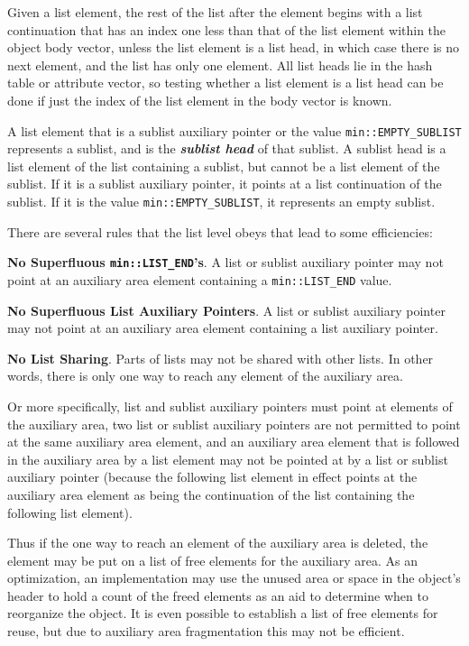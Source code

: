 \documentclass[12pt]{article}
\newcommand{\key}[1]{{\bf \em #1}\index{#1}}
\newenvironment{indpar}[1][0.3in]%
	{\begin{list}{}%
		     {\setlength{\itemsep}{0in}%
		      \setlength{\topsep}{0in}%
		      \setlength{\parsep}{1ex}%
		      \setlength{\labelwidth}{#1}%
		      \setlength{\leftmargin}{#1}%
		      \addtolength{\leftmargin}{\labelsep}}%
	 \item}%
	{\end{list}}
\begin{document}
Given a list element, the rest of the list after the element begins with
a list continuation that has an index one less than that of the list
element within the object body vector, unless the list element is a
list head, in which case there is no next element, and the list has only
one element.  All list heads lie in the hash table or attribute vector,
so testing whether a list element is a list head can be done if just the
index of the list element in the body vector is known.

A list element
that is a sublist auxiliary pointer or the value \verb|min::EMPTY_SUBLIST|
represents a sublist, and is the \key{sublist head} of that sublist.  A
sublist head is a list element of the list containing a sublist,
but cannot be a list element of the sublist.
If it is a sublist auxiliary pointer,
it points at a list continuation of the sublist.  If it is the
value \verb|min::EMPTY_SUBLIST|, it represents an empty sublist.

There are several rules that the list level obeys that lead to
some efficiencies:

\begin{indpar}
{\bf No Superfluous {\tt \bf min::LIST\_END}'s}.%
%
\label{NO-SUPERFLUOUS-LIST}
A list or sublist auxiliary pointer may not point at an auxiliary
area element containing a \verb|min::LIST_END| value.

{\bf No Superfluous List Auxiliary Pointers}.%
A list or sublist auxiliary pointer may not point at an auxiliary
area element containing a list auxiliary pointer.

{\bf No List Sharing}.%
Parts of lists may not be shared with other lists.  In other words,
there is only one way to reach any element of the auxiliary area.

Or more specifically, list and sublist
auxiliary pointers must point at elements of the auxiliary area,
two list or sublist auxiliary pointers are not permitted to point
at the same auxiliary
area element, and an auxiliary area element that is followed
in the auxiliary area by a list element may not be pointed at by
a list or sublist auxiliary pointer (because the following list element
in effect points at the auxiliary area element as being the
continuation of the list containing the following list element).
\end{indpar}

Thus if the one way to reach an element of
the auxiliary area is deleted, the element may be put on a list of
free elements for the auxiliary area.  As an optimization,
an implementation may use the unused area or space in the object's header
to hold a count of the freed elements as an aid to determine when to
reorganize the object.  It is even possible to establish a list of
free elements for reuse, but due to auxiliary area fragmentation this
may not be efficient.
\end{document}
